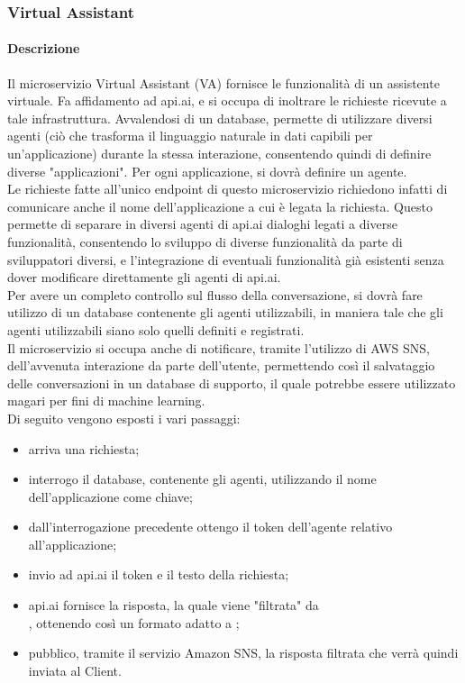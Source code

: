 \subsubsection{Virtual Assistant}
\paragraph{Descrizione}
Il microservizio Virtual Assistant (VA) fornisce le funzionalità di un assistente virtuale. Fa affidamento ad api.ai, e si occupa di inoltrare le richieste ricevute a tale infrastruttura. Avvalendosi di un database, permette di utilizzare diversi agenti (ciò che trasforma il linguaggio naturale in dati capibili per un'applicazione) durante la stessa interazione, consentendo quindi di definire diverse "applicazioni". Per ogni applicazione, si dovrà definire un agente.\\ Le richieste fatte all'unico endpoint di questo microservizio richiedono infatti di comunicare anche il nome dell'applicazione a cui è legata la richiesta. Questo permette di separare in diversi agenti di api.ai dialoghi legati a diverse funzionalità, consentendo lo sviluppo di diverse funzionalità da parte di sviluppatori diversi, e l'integrazione di eventuali funzionalità già esistenti senza dover modificare direttamente gli agenti di api.ai. \\
Per avere un completo controllo sul flusso della conversazione, si dovrà fare utilizzo di un database contenente gli agenti utilizzabili, in maniera tale che gli agenti utilizzabili siano solo quelli definiti e registrati.\\
Il microservizio si occupa anche di notificare, tramite l'utilizzo di AWS SNS, dell'avvenuta interazione da parte dell'utente, permettendo così il salvataggio delle conversazioni in un database di supporto, il quale potrebbe essere utilizzato magari per fini di machine learning.\\
Di seguito vengono esposti i vari passaggi:
\begin{itemize}
	\item arriva una richiesta;
	\item interrogo il database, contenente gli agenti, utilizzando il nome dell'applicazione come chiave;
	\item dall'interrogazione precedente ottengo il token dell'agente relativo all'applicazione;
	\item invio ad api.ai il token e il testo della richiesta;
	\item api.ai fornisce la risposta, la quale viene "filtrata" da\\ , ottenendo così un formato adatto a ;
	\item pubblico, tramite il servizio Amazon SNS, la risposta filtrata che verrà quindi inviata al Client.
\end{itemize}
